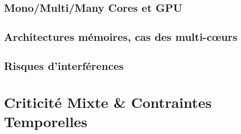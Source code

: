 \documentclass[french, a4paper, 11pt, twoside, pdftex]{StyleThese}
\begin{document}
 
    \subsection{Mono/Multi/Many Cores et GPU}
    \subsection{Architectures mémoires, cas des multi-c\oe{}urs}
	\subsection{Risques d'interférences}
	
\section{Criticité Mixte \& Contraintes Temporelles}

\end{document}
